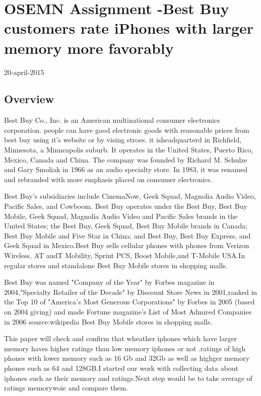 \documentclass{article}\usepackage[]{graphicx}\usepackage[]{color}
\begin{document}
    \section*{OSEMN Assignment -Best Buy customers rate iPhones with larger memory more favorably}
  {20-april-2015}
    
\subsection*{Overview}
    
   \par Best Buy Co., Inc. is an American multinational consumer electronics corporation.
people can have good electronic goods with reasonable prices from best buy using it's website
or by vising stroes. it isheadquarterd in Richfield, Minnesota, a Minneapolis suburb. It operates in the United States, Puerto Rico, Mexico, Canada and China. The company was founded by Richard M. Schulze and Gary Smoliak in 1966 as an audio specialty store. In 1983, it was renamed and rebranded with more emphasis placed on consumer electronics.
\smallskip
\par Best Buy's subsidiaries include CinemaNow, Geek Squad, Magnolia Audio Video, Pacific Sales, and Cowboom. Best Buy operates under the Best Buy, Best Buy Mobile, Geek Squad, Magnolia Audio Video and Pacific Sales brands in the United States; the Best Buy, Geek Squad, Best Buy Mobile brands in Canada; Best Buy Mobile and Five Star in China; and Best Buy, Best Buy Express, and Geek Squad in Mexico.Best Buy sells cellular phones with phones from Verizon Wireless, AT andT Mobility, Sprint PCS, Boost Mobile,and T-Mobile USA.In regular stores and standalone Best Buy Mobile stores in shopping malls.
\smallskip
\par Best Buy was named "Company of the Year" by Forbes magazine in 2004,"Specialty Retailer of the Decade" by Discount Store News in 2001,ranked in the Top 10 of "America's Most Generous Corporations" by Forbes in 2005 (based on 2004 giving) and made Fortune magazine's List of Most Admired Companies in 2006
source:wikipedia
Best Buy Mobile stores in shopping malls.
\smallskip
\par This paper will check and confirm that wheather  iphones which have larger memory haves higher ratings than low memory iphones or not .ratings  of high phones with lower memory such as 16 Gb and 32Gb as well as highger memory phones such as 64 and 128GB.I started our work with collecting data about iphones such as their memory and ratings.Next step would be to take average of ratings memorywoie and compare them.
\smallskip
\end{document}
